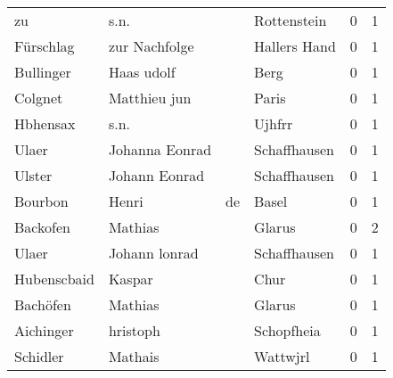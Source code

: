 \begin{tabular}{llllrr}
                       zu &                               s.n. &             &                                 Rottenstein &          0 &         1 \\
                Fürschlag &                      zur Nachfolge &             &                                Hallers Hand &          0 &         1 \\
                Bullinger &                         Haas udolf &             &                                        Berg &          0 &         1 \\
                  Colgnet &                       Matthieu jun &             &                                       Paris &          0 &         1 \\
                 Hbhensax &                               s.n. &             &                                      Ujhfrr &          0 &         1 \\
                    Ulaer &                     Johanna Eonrad &             &                                Schaffhausen &          0 &         1 \\
                   Ulster &                      Johann Eonrad &             &                                Schaffhausen &          0 &         1 \\
                  Bourbon &                              Henri &          de &                                       Basel &          0 &         1 \\
                 Backofen &                            Mathias &             &                                      Glarus &          0 &         2 \\
                    Ulaer &                      Johann lonrad &             &                                Schaffhausen &          0 &         1 \\
              Hubenscbaid &                             Kaspar &             &                                        Chur &          0 &         1 \\
                 Bachöfen &                            Mathias &             &                                      Glarus &          0 &         1 \\
                Aichinger &                           hristoph &             &                                  Schopfheia &          0 &         1 \\
                 Schidler &                            Mathais &             &                                    Wattwjrl &          0 &         1 \\

\end{tabular}

